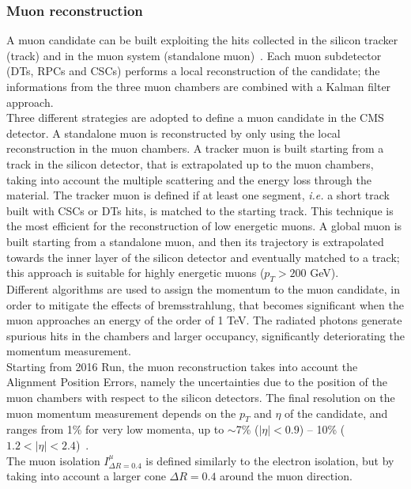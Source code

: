 \subsubsection{Muon reconstruction}
A muon candidate can be built exploiting the hits collected in the silicon tracker (track) and in the muon system (standalone muon)~\cite{Chatrchyan:2012xi}. Each muon subdetector (DTs, RPCs and CSCs) performs a local reconstruction of the candidate; the informations from the three muon chambers are combined with a Kalman filter approach.\\
Three different strategies are adopted to define a muon candidate in the CMS detector. A standalone muon is reconstructed by only using the local reconstruction in the muon chambers. A tracker muon is built starting from a track in the silicon detector, that is extrapolated up to the muon chambers, taking into account the multiple scattering and the energy loss through the material. The tracker muon is defined if at least one segment, \textit{i.e.} a short track built with CSCs or DTs hits, is matched to the starting track. This technique is the most efficient for the reconstruction of low energetic muons. A global muon is built starting from a standalone muon, and then its trajectory is extrapolated towards the inner layer of the silicon detector and eventually matched to a track; this approach is suitable for highly energetic muons ($p_T>200$ GeV).\\
Different algorithms are used to assign the momentum to the muon candidate, in order to mitigate the effects of bremsstrahlung, that becomes significant when the muon approaches an energy of the order of 1 TeV. The radiated photons generate spurious hits in the chambers and larger occupancy, significantly deteriorating the momentum measurement.\\
Starting from 2016 Run, the muon reconstruction takes into account the Alignment Position Errors, namely the uncertainties due to the position of the muon chambers with respect to the silicon detectors. The final resolution on the muon momentum measurement depends on the $p_T$ and $\eta$ of the candidate, and ranges from 1\% for very low momenta, up to $\sim$7\% ($|\eta|<0.9$) -- 10\% ($1.2 < |\eta| < 2.4$)~\cite{CMS-DP-2016-067}.\\
The muon isolation $I_{\Delta R = 0.4}^{\mu}$ is defined similarly to the electron isolation, but by taking into account a larger cone $\Delta R = 0.4$ around the muon direction.

